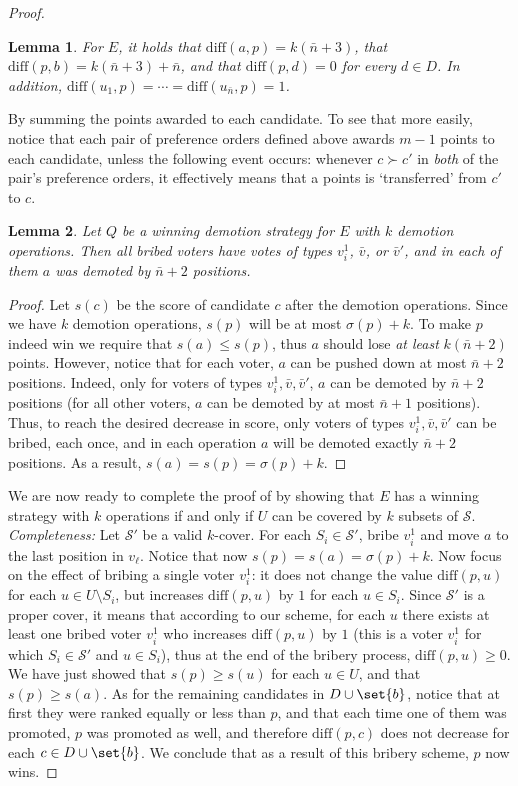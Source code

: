 \documentclass[letterpaper]{article} %
\newtheorem{lemma}{Lemma}
\newcommand{\diff}{\mathrm{diff}}
\begin{document}
\begin{proof}
\begin{lemma}
For $E$, it holds that  $\diff(a,p)=k(\bar{n}+3)$,  that $\diff(p,b)= k(\bar{n}+3) + \bar{n}$, and that
  $\diff(p,d)= 0$  for every $d \in D$. In addition, $\diff(u_1,p)=\cdots=\diff(u_{\bar{n}},p)=1$.
\end{lemma}
By summing the points awarded to each candidate. To see that more easily, notice that each pair of preference orders defined above awards $m-1$ points to each candidate, unless the following event occurs: whenever $c \succ c'$ in \emph{both} of the pair's preference orders, it effectively means that a points is `transferred' from $c'$ to $c$.
\begin{lemma}\label{lem:pushed}
Let $Q$ be a winning demotion strategy for $E$ with $k$ demotion operations. Then all bribed voters have votes of types $v_i^1$, $\bar{v}$, or $\bar{v}'$, and in each of them  $a$ was demoted by $\bar{n}+2$ positions.
\end{lemma}
\begin{proof}
Let $s(c)$ be the score of candidate $c$ after the demotion operations.
Since we have $k$ demotion operations, $s(p)$ will be at most $\sigma(p)+k$. To make $p$ indeed win we require that $s(a) \leq s(p)$, thus $a$ should lose \emph{at least} $k(\bar{n}+2)$ points. However, notice that for each voter, $a$ can be pushed down at most $\bar{n}+2$ positions. Indeed, only for voters of types $v_i^1, \bar{v}, \bar{v}'$, $a$ can be demoted by $\bar{n}+2$ positions (for all other voters, $a$ can be demoted by at most $\bar{n}+1$ positions). Thus, to reach the desired decrease in score, only voters of types $v_i^1, \bar{v}, \bar{v}'$ can be bribed, each once, and in each operation  $a$ will be demoted exactly $\bar{n}+2$ positions. As a result, $s(a)=s(p)=\sigma(p)+k$.
    \end{proof}
We are now ready to complete the proof of  by showing that
$E$ has a winning strategy with $k$ operations if and only if $U$ can be covered by $k$ subsets of $\mathcal{S}$.
\textit{Completeness:} Let $\mathcal{S}'$ be a valid $k$-cover. For each $S_i \in \mathcal{S}'$, bribe $v_i^1$ and move $a$ to the last position in $v_\ell$. Notice that now $s(p) =s(a) = \sigma(p)+k$. Now focus on the effect of bribing a single voter $v_i^1$:  it does not change the value $\diff(p,u)$ for each $u \in U\setminus S_i$, but increases $\diff(p,u)$ by $1$ for each $u \in S_i$. Since $\mathcal{S}'$  is a proper cover, it means that according to our scheme, for each $u$ there exists at least one bribed voter $v_i^1$  who  increases $\diff(p,u)$ by $1$ (this is a voter $v_i^1$ for which $S_i \in \mathcal{S}'$ and $u \in S_i$), thus at the end of the bribery process, $\diff(p,u) \geq 0$. We have just showed that $s(p) \geq s(u)$ for each $u \in U$, and that $s(p) \geq s(a)$. As for the remaining candidates in $D \cup \set{b}$, notice that at first they were ranked equally or less than $p$, and that each time one of them was promoted, $p$ was promoted as well, and therefore $\diff(p,c)$ does not decrease for each $c \in D \cup \set{b}$. We conclude that as a result of this bribery scheme, $p$ now wins.

\end{proof}
\end{document}
